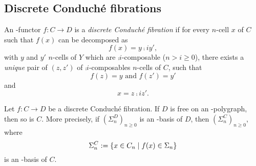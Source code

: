 \documentclass{amsart}
\begin{document}
\subsection{Discrete Conduché fibrations}
\begin{definition}
  An \oo\nbd-functor $f \colon C \to D$ is a \emph{discrete Conduché
    fibration} if for every $n$\nbd-cell $x$ of $C$ such that $f(x)$
  can be decomposed as
  \[
    f(x)=y\comp{i}y',
  \]
  with $y$ and $y'$ $n$\nbd-cells of $Y$ which are
  $\comp{i}$\nbd-composable ($n >i \geq 0$), there exists a \emph{unique} pair of
  $(z,z')$ of $\comp{i}$\nbd-composables $n$\nbd-cells of $C$, such that
  \[
    f(z)=y\text{ and }f(z')=y'
  \]
  and
  \[
   x= z\comp{i}z'.
  \]
\end{definition}
\begin{proposition}\cite{guettametayer:}
  Let $f \colon C \to D$ be a discrete Conduché fibration. If $D$ is
  free on an \nbd-polygraph, then so is $C$. More precisely, if
  $(\Sigma_n^D)_{n\geq 0}$ is an \nbd-basis of $D$, then
  $(\Sigma_n^C)_{n \geq 0}$, where
  \[
    \Sigma_n^C:=\left\{ x \in C_n\; | \; f(x)\in \Sigma_n\right\}
  \]
  is an \nbd-basis of $C$.
\end{proposition}
\end{document}
